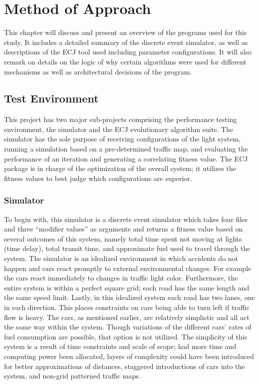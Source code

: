 %
%
\chapter{Method of Approach} \label{ch:method}
This chapter will discuss and present an overview of the programs used for this study.  It includes a detailed summary of the discrete event simulator, as well as descriptions of the ECJ tool used including parameter configurations.  It will also remark on details on the logic of why certain algorithms were used for different mechanisms as well as architectural decisions of the program.

\section{Test Environment}

This project has two major sub-projects comprising the performance testing environment, the simulator and the ECJ evolutionary algorithm suite.  The simulator has the sole purpose of receiving configurations of the light system, running a simulation based on a pre-determined traffic map, and evaluating the performance of an iteration and generating a correlating fitness value.  The ECJ package is in charge of the optimization of the overall system; it utilizes the fitness values to best judge which configurations are superior.

\subsection{Simulator}
To begin with, this simulator is a discrete event simulator which takes four files and three ``modifier values'' as arguments and returns a fitness value based on several outcomes of this system, namely total time spent not moving at lights (time delay), total transit time, and approximate fuel used to travel through the system.  The simulator is an idealized environment in which accidents do not happen and cars react promptly to external environmental changes.  For example the cars react immediately to changes in traffic light color.  Furthermore, the entire system is within a perfect square grid; each road has the same length and the same speed limit.  Lastly, in this idealized system each road has two lanes, one in each direction.  This places constraints on cars being able to turn left if traffic flow is heavy.  The cars, as mentioned earlier, are relatively simplistic and all act the same way within the system.  Though variations of the different cars' rates of fuel consumption are possible, that option is not utilized.  The simplicity of this system is a result of time constraints and scale of scope; had more time and computing power been allocated, layers of complexity could have been introduced for better approximations of distances, staggered introductions of cars into the system, and non-grid patterned traffic maps.

